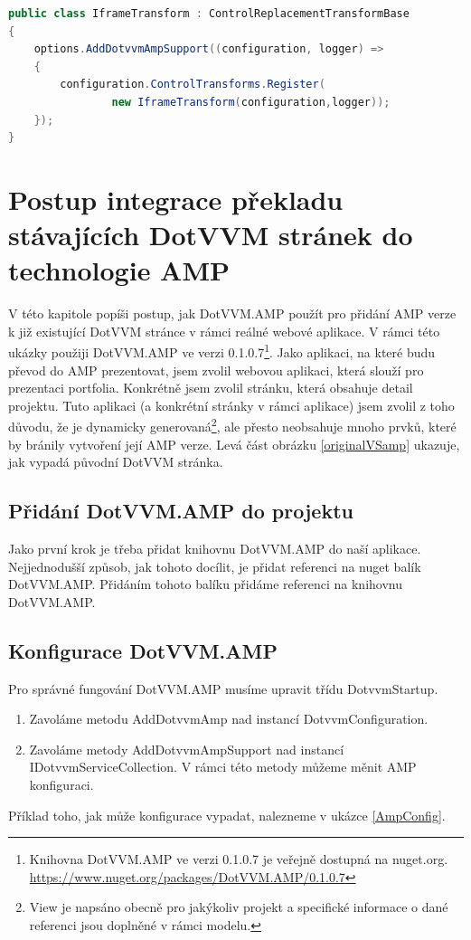     \begin{lstlisting}[language=c#, caption=Ukazka možné implementace tranformace pro iframe,label=TransformRegistration,captionpos=t]
public class IframeTransform : ControlReplacementTransformBase
{
    options.AddDotvvmAmpSupport((configuration, logger) =>
    {
        configuration.ControlTransforms.Register(
                new IframeTransform(configuration,logger));
    });
}
\end{lstlisting}

\chapter{Postup integrace překladu stávajících DotVVM stránek do technologie AMP}
V této kapitole popíši postup, jak DotVVM.AMP použít pro přidání AMP verze k již existující DotVVM stránce v rámci reálné webové aplikace. V rámci této ukázky použiji DotVVM.AMP ve verzi 0.1.0.7\footnote{\label{nuget}Knihovna DotVVM.AMP ve verzi 0.1.0.7 je veřejně dostupná na nuget.org.\newline
\url{https://www.nuget.org/packages/DotVVM.AMP/0.1.0.7}}. Jako aplikaci, na které budu převod do AMP prezentovat, jsem zvolil webovou aplikaci, která slouží pro prezentaci portfolia. Konkrétně jsem zvolil stránku, která obsahuje detail projektu. Tuto aplikaci (a konkrétní stránky v rámci aplikace) jsem zvolil z toho důvodu, že je dynamicky generovaná\footnote{View je napsáno obecně pro jakýkoliv projekt a specifické informace o dané referenci jsou doplněné v rámci modelu. }, ale přesto neobsahuje mnoho prvků, které by bránily vytvoření její AMP verze. Levá část obrázku \ref{originalVSamp} ukazuje, jak vypadá původní DotVVM stránka.

\section*{Přidání DotVVM.AMP do projektu}
Jako první krok je třeba přidat knihovnu DotVVM.AMP do naší aplikace. Nejjednodušší způsob, jak tohoto docílit, je přidat referenci na nuget balík DotVVM.AMP. Přidáním tohoto balíku přidáme referenci na knihovnu DotVVM.AMP.
\section*{Konfigurace DotVVM.AMP}
Pro správné fungování DotVVM.AMP musíme upravit třídu DotvvmStartup.
\begin{enumerate}
    \item  Zavoláme metodu AddDotvvmAmp nad instancí DotvvmConfiguration.
    \item Zavoláme metody AddDotvvmAmpSupport nad instancí IDotvvmServiceCollection.\newline
    V rámci této metody můžeme měnit AMP konfiguraci.
\end{enumerate}
Příklad toho, jak může konfigurace vypadat, nalezneme v ukázce \ref{AmpConfig}.

